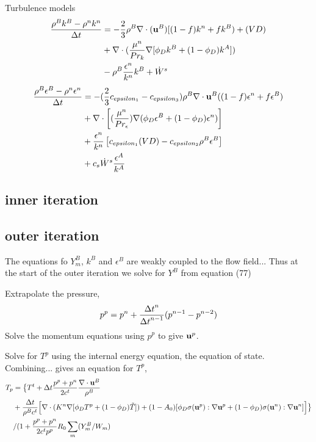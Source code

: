 \documentclass{article}
\begin{document}
Turbulence models
\begin{align*}
  {\rho^B k^B - \rho^n k^n \over {\Delta t}} &= -{2\over3} \rho^B\nabla\cdot({\bf u}^B)[(1-f)k^n + f k^B) 
       + (VD)   \\
       & + \nabla\cdot( {\mu^n\over Pr_k} \nabla[ \phi_D k^B + (1-\phi_D) k^A] )  \\
       & - \rho^B {\epsilon^n\over k^n} k^B + \dot{W}^s
\end{align*}
\begin{align*}
  { \rho^B\epsilon^B -\rho^n\epsilon^n \over {\Delta t}} &=
        -( {2\over 3} c_{epsilon_1} -c_{epsilon_3} )\rho^B \nabla\cdot{\bf u}^B ( (1-f)\epsilon^n + f \epsilon^B) \\
      &   +\nabla\cdot \left[ ({\mu^n \over Pr_\epsilon }) \nabla ( \phi_D \epsilon^B+(1-\phi_D)\epsilon^n) \right] \\
      & + {\epsilon^n\over k^n}\left[ c_{epsilon_1}(VD) - c_{epsilon_2}\rho^B\epsilon^B \right] \\
      &  + c_s \dot{W}^s{\epsilon^A \over k^A}
\end{align*}


\subsection{inner iteration}


\subsection{outer iteration}

The equations fo $Y_m^B$, $k^B$ and $\epsilon^B$ are weakly coupled to the flow
field...
Thus at the start of the outer iteration we solve for $Y^B$ from equation (77)


Extrapolate the pressure,
\[
   p^p = p^n + {{\Delta t}^n\over {\Delta t}^{n-1}}( p^{n-1} - p^{n-2} )
\]
Solve the momentum equations using $p^p$ to give ${\bf u}^p$.

Solve for $T^p$ using the internal energy equation, the equation of state.
Combining... gives an equation for $T^p$,
\begin{align}
T_p &= \big\{ T^t + {\Delta t} {p^p+p^n\over 2 c^t} {\nabla\cdot{\bf u}^B \over \rho^B}  \label{eq:kiva:te} \\
    & + {{\Delta t}\over\rho^B c^t} \Big[\nabla\cdot( K^n \nabla[ \phi_D T^p + (1-\phi_D) \tilde{T} ] ) 
       + (1-A_0)[ \phi_D {\bf\sigma}({\bf u}^p):\nabla{\bf u}^p + (1-\phi_D) {\bf\sigma}({\bf u}^n):\nabla{\bf u}^n]  \Big] \big\} \\
 & / ( 1 + {p^p+p^n \over 2 c^t p^p } R_0 \sum_m ( Y_m^B/W_m )
\end{align}
\end{document}
